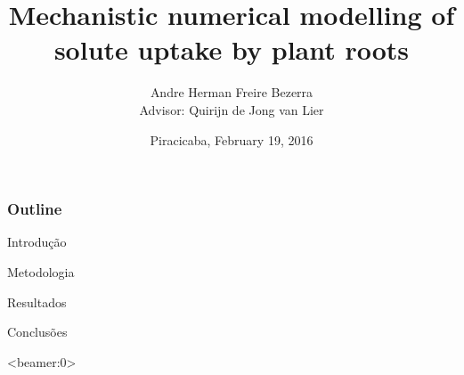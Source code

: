 \documentclass[compress]{beamer}  %
\title{Mechanistic numerical modelling of solute uptake by plant roots}
\author[Bezerra, A.H.F.]
{
Andre Herman Freire Bezerra\\
{\scriptsize Advisor: Quirijn de Jong van Lier}
}
\institute{University of S\~ao Paulo}
\date
{Piracicaba, February 19, 2016}
\begin{document}
\frame{\titlepage}

\begin{frame}
\frametitle{Outline}
Introdução

Metodologia

Resultados

Conclusões
\end{frame}







{\scriptsize 
}

\begin{frame}<beamer:0>		%

\end{frame}
\end{document}
